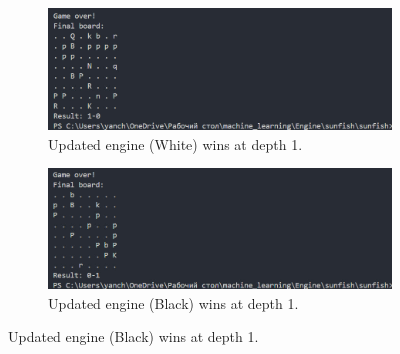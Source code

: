 \documentclass[12pt,a4paper]{article}
\begin{document}
\begin{figure}[H]
    \vspace{1em}

    \begin{subfigure}[b]{0.49\textwidth}
        \centering
        \includegraphics[width=\textwidth]{figures/yanfishwhitedepth1.png}
        \caption{Updated engine (White) wins at depth 1.}
        \label{fig:screenshot3}
        
        \vspace{0.5em}

    \end{subfigure}
    \hfill
    \begin{subfigure}[b]{0.49\textwidth}
        \centering
        \includegraphics[width=\textwidth]{figures/yanfishblackdepth1.png}
        \caption{Updated engine (Black) wins at depth 1.}
        \label{fig:screenshot4}
        
        \vspace{0.5em}

    \end{subfigure}

    
    \label{fig:all_screens_large}
\end{figure}
\end{document}
